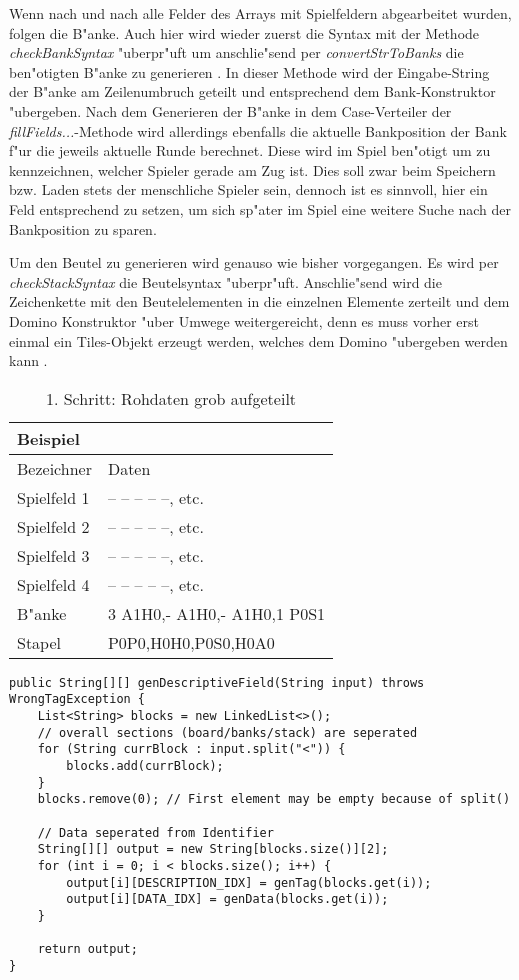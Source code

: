 Wenn nach und nach alle Felder des Arrays mit Spielfeldern abgearbeitet wurden, folgen die B"anke. Auch hier wird wieder zuerst die Syntax mit der Methode \emph{checkBankSyntax} "uberpr"uft um anschlie"send per \emph{convertStrToBanks} die ben"otigten B"anke zu generieren . In dieser Methode wird der Eingabe-String der B"anke am Zeilenumbruch geteilt und entsprechend dem Bank-Konstruktor "ubergeben. Nach dem Generieren der B"anke in dem Case-Verteiler der \emph{fillFields...}-Methode wird allerdings ebenfalls die aktuelle Bankposition der Bank f"ur die jeweils aktuelle Runde berechnet. Diese wird im Spiel ben"otigt um zu kennzeichnen, welcher Spieler gerade am Zug ist. Dies soll zwar beim Speichern bzw. Laden stets der menschliche Spieler sein, dennoch ist es sinnvoll, hier ein Feld entsprechend zu setzen, um sich sp"ater im Spiel eine weitere Suche nach der Bankposition zu sparen. 

Um den Beutel zu generieren wird genauso wie bisher vorgegangen. Es wird per \emph{checkStackSyntax} die Beutelsyntax "uberpr"uft. Anschlie"send wird die Zeichenkette mit den Beutelelementen in die einzelnen Elemente zerteilt und dem Domino Konstruktor "uber Umwege weitergereicht, denn es muss vorher erst einmal ein Tiles-Objekt erzeugt werden, welches dem Domino "ubergeben werden kann . 

\begin{table}
\centering
\begin{tabular}{ll}
\toprule
Beispiel\\
\midrule
Bezeichner & Daten\\
\midrule
Spielfeld 1 & -- -- -- -- --, etc.\\
Spielfeld 2 & -- -- -- -- --, etc.\\
Spielfeld 3 & -- -- -- -- --, etc.\\
Spielfeld 4 & -- -- -- -- --, etc.\\
B"anke & 3 A1H0,- A1H0,- A1H0,1 P0S1\\
Stapel & P0P0,H0H0,P0S0,H0A0\\
\bottomrule
\end{tabular}
\caption{1. Schritt: Rohdaten grob aufgeteilt}
\label{tab:bspRochdaten}
\end{table}
 
\begin{lstlisting}[style=CodeHighlighting,float,caption=Converter - genDescriptiveField,label=lst:converter_genDescriptiveField]
public String[][] genDescriptiveField(String input) throws WrongTagException {
    List<String> blocks = new LinkedList<>();
    // overall sections (board/banks/stack) are seperated
    for (String currBlock : input.split("<")) {
        blocks.add(currBlock);
    }
    blocks.remove(0); // First element may be empty because of split()

    // Data seperated from Identifier
    String[][] output = new String[blocks.size()][2];
    for (int i = 0; i < blocks.size(); i++) {
        output[i][DESCRIPTION_IDX] = genTag(blocks.get(i));
        output[i][DATA_IDX] = genData(blocks.get(i));
    }

    return output;
}
\end{lstlisting}

